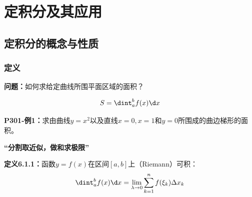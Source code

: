 \setcounter{chapter}{5}

\chapter{定积分及其应用}

\section{定积分的概念与性质}

\subsection{定义}

{\bf 问题：}如何求给定曲线所围平面区域的面积？

\begin{center}
	
	$$S=\dint_a^bf(x)\d x$$
\end{center}

{\bf P301-例1：}求由曲线$y=x^2$以及直线$x=0,x=1$和$y=0$所围成的曲边梯形的面积。

\begin{center}
	{\bf “分割取近似，做和求极限”}
\end{center}

{\bf 定义6.1.1：}函数$y=f(x)$在区间$[a,b]$上（Riemann）可积：
$$\dint_a^bf(x)\d x=\lim\limits_{\lambda\to
0}\sum\limits_{k=1}^nf(\xi_k)\Delta x_k$$

